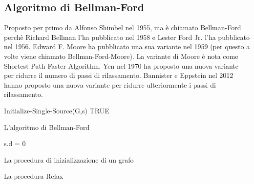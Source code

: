 \documentclass{article}
\begin{document}
	\subsection{Algoritmo di Bellman-Ford}
	Proposto per primo da Alfonso Shimbel nel 1955, ma è chiamato Bellman-Ford perchè Richard Bellman l'ha pubblicato nel 1958 e Lester Ford Jr. l'ha pubblicato nel 1956. Edward F. Moore ha pubblicato una sua variante nel 1959 (per questo a volte viene chiamato Bellman-Ford-Moore). La variante di Moore è nota come Shortest Path Faster Algorithm. Yen nel 1970 ha proposto una nuova variante per ridurre il numero di passi di rilassamento. Bannister e Eppstein nel 2012 hanno proposto una nuova variante per ridurre ulteriormente i passi di rilassamento.
	
	\begin{algorithm}[H]
		Initialize-Single-Source(G,s)\;
		\Return TRUE\;
		\caption{L'algoritmo di Bellman-Ford}
	\end{algorithm}

	\begin{algorithm}[H]
		s.d = 0\;
		\caption{La procedura di inizializzazione di un grafo}
	\end{algorithm}

	\begin{algorithm}[H]
		\caption{La procedura Relax}
	\end{algorithm}
	
\end{document}

